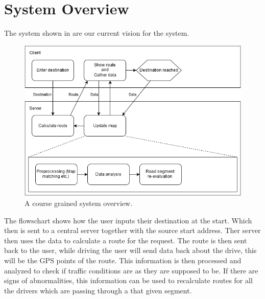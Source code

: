 \section{System Overview}
The system shown in  are our current vision for the system.

\begin{figure}[h!]
  \centering
    \includegraphics[width=1\textwidth]{figures/system-overview.png}
    \caption{A course grained system overview.}
    \label{fig:systemoverview}
\end{figure}

The flowschart shows how the user inputs their destination at the start. Which then is sent to a central server together with the source start address. Ther server then uses the data to calculate a route for the request. The route is then sent back to the user, while driving the user will send data back about the drive, this will be the GPS points of the route. This information is then processed and analyzed to check if traffic conditions are as they are supposed to be. If there are signs of abnormalities, this information can be used to recalculate routes for all the drivers which are passing through a that given segment. 